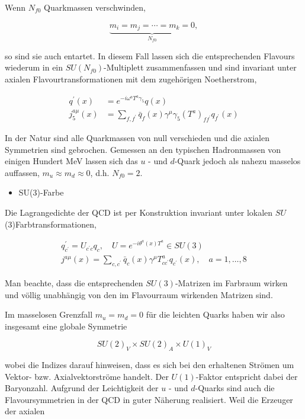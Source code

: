 \documentclass[10pt, letterpaper]{article}
\begin{document}
Wenn $N_{f 0}$ Quarkmassen verschwinden,

$$
\underbrace{m_{i}=m_{j}=\cdots=m_{k}=0}_{N_{f 0}},
$$

so sind sie auch entartet. In diesem Fall lassen sich die entsprechenden Flavours wiederum in ein $S U\left(N_{f 0}\right)$-Multiplett zusammenfassen und sind invariant unter axialen Flavourtransformationen mit dem zugehörigen Noetherstrom,

$$
\begin{aligned}
q^{\prime}(x) & =e^{-i \omega^{a} T^{a} \gamma_{5}} q(x) \\
j_{5}^{a \mu}(x) & =\sum_{f, f^{\prime}} \bar{q}_{f}(x) \gamma^{\mu} \gamma_{5}\left(T^{a}\right)_{f f^{\prime}} q_{f^{\prime}}(x)
\end{aligned}
$$

In der Natur sind alle Quarkmassen von null verschieden und die axialen Symmetrien sind gebrochen. Gemessen an den typischen Hadronmassen von einigen Hundert MeV lassen sich das $u$ - und $d$-Quark jedoch als nahezu masselos auffassen, $m_{u} \approx m_{d} \approx 0$, d.h. $N_{f 0}=2$.

\begin{itemize}
  \item SU(3)-Farbe
\end{itemize}

Die Lagrangedichte der QCD ist per Konstruktion invariant unter lokalen $S U$ (3)Farbtransformationen,

$$
\begin{gathered}
q_{c^{\prime}}^{\prime}=U_{c^{\prime} c} q_{c}, \quad U=e^{-i \theta^{a}(x) T^{a}} \in S U(3) \\
j^{a \mu}(x)=\sum_{c, c^{\prime}} \bar{q}_{c}(x) \gamma^{\mu} T_{c c^{\prime}}^{a} q_{c^{\prime}}(x), \quad a=1, \ldots, 8
\end{gathered}
$$

Man beachte, dass die entsprechenden $S U(3)$-Matrizen im Farbraum wirken und völlig unabhängig von den im Flavourraum wirkenden Matrizen sind.

Im masselosen Grenzfall $m_{u}=m_{d}=0$ für die leichten Quarks haben wir also insgesamt eine globale Symmetrie

$$
S U(2)_{V} \times S U(2)_{A} \times U(1)_{V}
$$

wobei die Indizes darauf hinweisen, dass es sich bei den erhaltenen Strömen um Vektor- bzw. Axialvektorströme handelt. Der $U(1)$-Faktor entspricht dabei der Baryonzahl. Aufgrund der Leichtigkeit der $u$ - und $d$-Quarks sind auch die Flavoursymmetrien in der QCD in guter Näherung realisiert. Weil die Erzeuger der axialen
\end{document}

